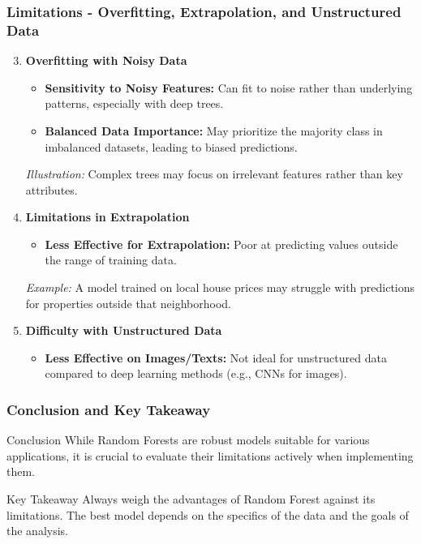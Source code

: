 \documentclass[aspectratio=169]{beamer}
\begin{document}
\begin{frame}[fragile]
    \frametitle{Limitations - Overfitting, Extrapolation, and Unstructured Data}
    \begin{enumerate}
        \setcounter{enumi}{2}
        \item \textbf{Overfitting with Noisy Data}
            \begin{itemize}
                \item \textbf{Sensitivity to Noisy Features:} Can fit to noise rather than underlying patterns, especially with deep trees.
                \item \textbf{Balanced Data Importance:} May prioritize the majority class in imbalanced datasets, leading to biased predictions.
            \end{itemize}
            \textit{Illustration:} Complex trees may focus on irrelevant features rather than key attributes.

        \item \textbf{Limitations in Extrapolation}
            \begin{itemize}
                \item \textbf{Less Effective for Extrapolation:} Poor at predicting values outside the range of training data.
            \end{itemize}
            \textit{Example:} A model trained on local house prices may struggle with predictions for properties outside that neighborhood.

        \item \textbf{Difficulty with Unstructured Data}
            \begin{itemize}
                \item \textbf{Less Effective on Images/Texts:} Not ideal for unstructured data compared to deep learning methods (e.g., CNNs for images).
            \end{itemize}
    \end{enumerate}
\end{frame}

\begin{frame}[fragile]
    \frametitle{Conclusion and Key Takeaway}
    \begin{block}{Conclusion}
        While Random Forests are robust models suitable for various applications, it is crucial to evaluate their limitations actively when implementing them.
    \end{block}
    
    \begin{block}{Key Takeaway}
        Always weigh the advantages of Random Forest against its limitations. The best model depends on the specifics of the data and the goals of the analysis.
    \end{block}
\end{frame}
\end{document}
